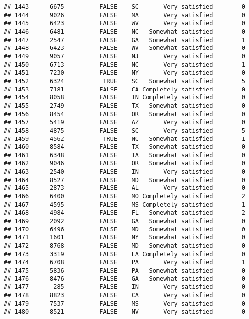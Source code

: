 \documentclass[]{book}
\theoremstyle{definition}
\theoremstyle{definition}
\theoremstyle{remark}
\begin{document}
\begin{verbatim}
## 1443      6675          FALSE    SC       Very satisfied        0
## 1444      9026          FALSE    MA       Very satisfied        0
## 1445      6423          FALSE    WV       Very satisfied        0
## 1446      6481          FALSE    NC   Somewhat satisfied        0
## 1447      2547          FALSE    GA   Somewhat satisfied        1
## 1448      6423          FALSE    WV   Somewhat satisfied        0
## 1449      9057          FALSE    NJ       Very satisfied        0
## 1450      6713          FALSE    NC       Very satisfied        1
## 1451      7230          FALSE    NY       Very satisfied        0
## 1452      6324           TRUE    SC   Somewhat satisfied        5
## 1453      7181          FALSE    CA Completely satisfied        0
## 1454      8058          FALSE    IN Completely satisfied        0
## 1455      2749          FALSE    TX   Somewhat satisfied        0
## 1456      8454          FALSE    OR   Somewhat satisfied        0
## 1457      5419          FALSE    AZ       Very satisfied        0
## 1458      4875          FALSE    SC       Very satisfied        5
## 1459      4562           TRUE    NC   Somewhat satisfied        1
## 1460      8584          FALSE    TX   Somewhat satisfied        0
## 1461      6348          FALSE    IA   Somewhat satisfied        0
## 1462      9046          FALSE    OR   Somewhat satisfied        0
## 1463      2540          FALSE    IN       Very satisfied        0
## 1464      8527          FALSE    MD   Somewhat satisfied        0
## 1465      2873          FALSE    AL       Very satisfied        0
## 1466      6400          FALSE    MO Completely satisfied        2
## 1467      4595          FALSE    MS Completely satisfied        1
## 1468      4984          FALSE    FL   Somewhat satisfied        2
## 1469      2092          FALSE    GA   Somewhat satisfied        0
## 1470      6496          FALSE    MD   Somewhat satisfied        0
## 1471      1601          FALSE    NY   Somewhat satisfied        0
## 1472      8768          FALSE    MD   Somewhat satisfied        0
## 1473      3319          FALSE    LA Completely satisfied        0
## 1474      6708          FALSE    PA       Very satisfied        1
## 1475      5836          FALSE    PA   Somewhat satisfied        0
## 1476      8476          FALSE    GA   Somewhat satisfied        0
## 1477       285          FALSE    IN       Very satisfied        0
## 1478      8823          FALSE    CA       Very satisfied        0
## 1479      7537          FALSE    MS       Very satisfied        0
## 1480      8521          FALSE    NV       Very satisfied        0

\end{verbatim}
\end{document}
